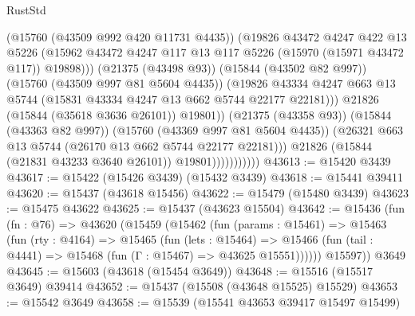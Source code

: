 \begin{lexlean}{RustStd}
\begin{coremodule}
                                    (@15760 (@43509 @992 @420 @11731 @4435))
                                    (@19826
                                      @43472
                                      @4247
                                      @422
                                      @13
                                      @5226
                                      (@15962
                                        @43472
                                        @4247
                                        @117
                                        @13
                                        @117
                                        @5226
                                        (@15970 (@15971 @43472 @117))
                                        @19898)))
                                  (@21375 (@43498 @93))
                                  (@15844 (@43502 @82 @997))
                                  (@15760 (@43509 @997 @81 @5604 @4435))
                                  (@19826
                                    @43334
                                    @4247
                                    @663
                                    @13
                                    @5744
                                    (@15831 @43334 @4247 @13 @662 @5744 @22177 @22181)))
                                @21826
                                (@15844 (@35618 @3636 @26101))
                                @19801))
                            (@21375 (@43358 @93))
                            (@15844 (@43363 @82 @997))
                            (@15760 (@43369 @997 @81 @5604 @4435))
                            (@26321 @663 @13 @5744 (@26170 @13 @662 @5744 @22177 @22181)))
                          @21826
                          (@15844 (@21831 @43233 @3640 @26101))
                          @19801)))))))))))
@43613 := @15420 @3439
@43617 := @15422 (@15426 @3439) (@15432 @3439)
@43618 := @15441 @39411
@43620 := @15437 (@43618 @15456)
@43622 := @15479 (@15480 @3439)
@43623 := @15475 @43622
@43625 := @15437 (@43623 @15504)
@43642 := @15436
    (fun (fn : @76) =>
    @43620
      (@15459
        (@15462
          (fun (params : @15461) =>
          @15463
            (fun (rty : @4164) =>
            @15465
              (fun (lets : @15464) =>
              @15466 (fun (tail : @4441) => @15468 (fun (Γ : @15467) => @43625 @15551))))))
        @15597))
    @3649
@43645 := @15603 (@43618 (@15454 @3649))
@43648 := @15516 (@15517 @3649) @39414
@43652 := @15437 (@15508 (@43648 @15525) @15529)
@43653 := @15542 @3649
@43658 := @15539 (@15541 @43653 @39417 @15497 @15499)

\end{coremodule}
\end{lexlean}
